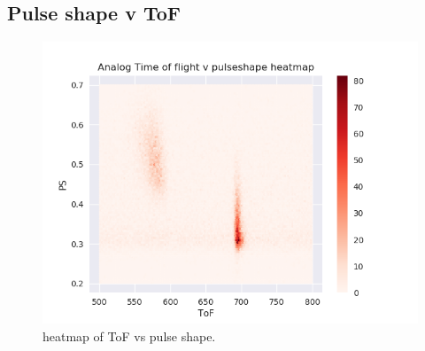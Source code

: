 \documentclass[main.tex]{subfiles}
\begin{document}
\subsection{Pulse shape v ToF}
\begin{figure}[ht]
    \centering
        \includegraphics[scale=.85]{AnalogResults/ps_tof.png}
        \caption{heatmap of ToF vs pulse shape.}
    \label{fig:tof_ps_a} 
\end{figure}
\end{document}
